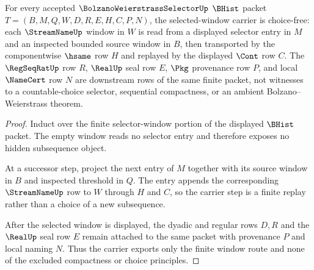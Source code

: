 \begin{theorem}
\label{thm:bolzanoweierstrassselector-window-choice-free-carrier}
For every accepted $\BolzanoWeierstrassSelectorUp$ $\BHist$ packet $T=(B,M,Q,W,D,R,E,H,C,P,N)$, the selected-window carrier is choice-free: each $\StreamNameUp$ window in $W$ is read from a displayed selector entry in $M$ and an inspected bounded source window in $B$, then transported by the componentwise $\hsame$ row $H$ and replayed by the displayed $\Cont$ row $C$. The $\RegSeqRatUp$ row $R$, $\RealUp$ seal row $E$, $\Pkg$ provenance row $P$, and local $\NameCert$ row $N$ are downstream rows of the same finite packet, not witnesses to a countable-choice selector, sequential compactness, or an ambient Bolzano--Weierstrass theorem.
\end{theorem}
\begin{proof}
Induct over the finite selector-window portion of the displayed $\BHist$ packet. The empty window reads no selector entry and therefore exposes no hidden subsequence object.

At a successor step, project the next entry of $M$ together with its source window in $B$ and inspected threshold in $Q$. The entry appends the corresponding $\StreamNameUp$ row to $W$ through $H$ and $C$, so the carrier step is a finite replay rather than a choice of a new subsequence.

After the selected window is displayed, the dyadic and regular rows $D,R$ and the $\RealUp$ seal row $E$ remain attached to the same packet with provenance $P$ and local naming $N$. Thus the carrier exports only the finite window route and none of the excluded compactness or choice principles.
\end{proof}

